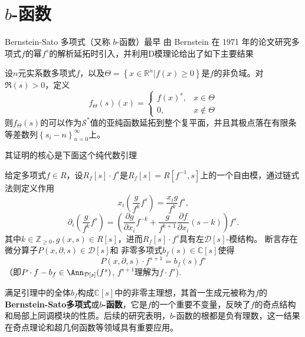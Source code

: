 

\section{$b$-函数}
Bernstein-Sato 多项式（又称 \(b\)-函数）最早 由 Bernstein 在 1971 年的论文\cite{bernshtein1972analytic}研究多项式$f$的幂$f^s$的解析延拓时引入，并利用D模理论给出了如下主要结果
\begin{theorem}
    设$n$元实系数多项式$f$，以及$\Theta=\left\{x\in \mathbb{R}^n|f(x)\geq 0\right\}$是$f$的非负域。对$\Re(s)>0$，定义
    \begin{equation*}
        f_{\Theta}(s)(x)=\begin{cases}
            f(x)^s, & x\in \Theta    \\
            0,      & x\notin \Theta
        \end{cases}
    \end{equation*}
    则$f_{\Theta}(s)$的可以作为$\mathcal{S}^*$值的亚纯函数延拓到整个复平面，并且其极点落在有限条等差数列$\left\{s_i-n\right\}_{n=0}^{\infty}$上。
\end{theorem}
其证明的核心是下面这个纯代数引理
\begin{lemma}\label{b-function}
    给定多项式$f\in R$，设$R_f[s]\cdot f^s$是$R_f[s]=R[f^{-1},s]$上的一个自由模，通过链式法则定义作用
    \begin{equation*}
        x_i\left(\frac{g}{f^k}f^s\right)=\frac{x_ig}{f^k}f^s,
    \end{equation*}
    \begin{equation*}
        \partial_i\left(\frac{g}{f^k}f^s\right)
        =
        \left(\frac{\partial g}{\partial x_i}f^{-k}+\frac{g}{f^{k+1}}\frac{\partial f}{\partial x_i}(s-k)\right)f^s.
    \end{equation*}
    其中$k\in \mathbb{Z}_{\geq 0},g(x,s)\in R[s]$，进而$R_f[s]\cdot f^s$具有左$\mathcal{D}[s]$-模结构。
    断言存在
    微分算子$P(x,\partial,s)\in \mathcal{D}[s]$和
    非零多项式$b_f(s)\in \mathbb{C}[s]$使得
    \begin{equation*}
        P(x,\partial,s)\cdot f^{s+1} = b_f(s) f^{s}
    \end{equation*}
    （即$P\cdot f -b_f \in \Ann_{\mathcal{D}[s]}(f^s)$, $f^{s+1}$理解为$f\cdot f^s$).
\end{lemma}
满足引理中的全体$b_f$构成$\mathbb{C}[s]$中的非零主理想，其首一生成元被称为$f$的\textbf{Bernstein-Sato多项式}或\textbf{$b$-函数}，它是$f$的一个重要不变量，反映了$f$的奇点结构和局部上同调模块的性质。后续的研究表明，$b$-函数的根都是负有理数，这一结果在奇点理论和超几何函数等领域具有重要应用。


